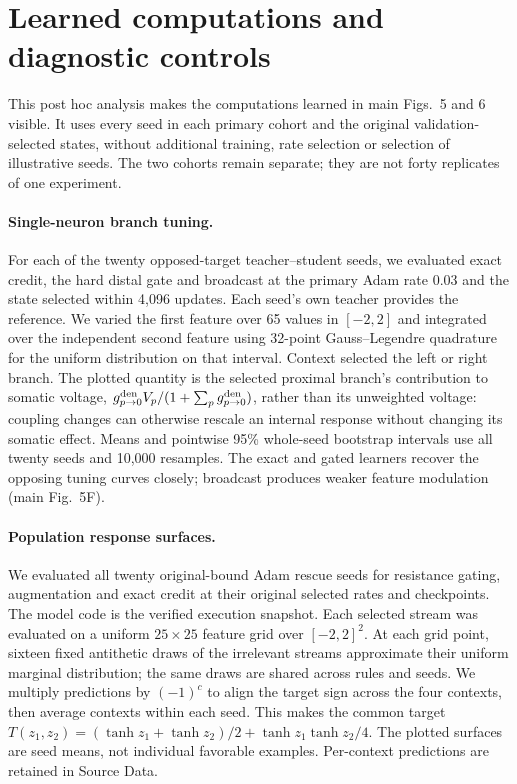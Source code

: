 \section{Learned computations and diagnostic controls}
\label{note:checkpoint_computation}

This post hoc analysis makes the computations learned in main Figs.~5 and 6 visible. It uses every seed in each primary cohort and the original validation-selected states, without additional training, rate selection or selection of illustrative seeds. The two cohorts remain separate; they are not forty replicates of one experiment.

\paragraph{Single-neuron branch tuning.}
For each of the twenty opposed-target teacher--student seeds, we evaluated exact credit, the hard distal gate and broadcast at the primary Adam rate 0.03 and the state selected within 4,096 updates. Each seed's own teacher provides the reference. We varied the first feature over 65 values in $[-2,2]$ and integrated over the independent second feature using 32-point Gauss--Legendre quadrature for the uniform distribution on that interval. Context selected the left or right branch. The plotted quantity is the selected proximal branch's contribution to somatic voltage, $g_{p\to0}^{\rm den}V_p/(1+\sum_p g_{p\to0}^{\rm den})$, rather than its unweighted voltage: coupling changes can otherwise rescale an internal response without changing its somatic effect. Means and pointwise 95\% whole-seed bootstrap intervals use all twenty seeds and 10,000 resamples. The exact and gated learners recover the opposing tuning curves closely; broadcast produces weaker feature modulation (main Fig.~5F).

\paragraph{Population response surfaces.}
We evaluated all twenty original-bound Adam rescue seeds for resistance gating, augmentation and exact credit at their original selected rates and checkpoints. The model code is the verified execution snapshot. Each selected stream was evaluated on a uniform $25\times25$ feature grid over $[-2,2]^2$. At each grid point, sixteen fixed antithetic draws of the irrelevant streams approximate their uniform marginal distribution; the same draws are shared across rules and seeds. We multiply predictions by $(-1)^c$ to align the target sign across the four contexts, then average contexts within each seed. This makes the common target $T(z_1,z_2)=(\tanh z_1+\tanh z_2)/2+\tanh z_1\tanh z_2/4$. The plotted surfaces are seed means, not individual favorable examples. Per-context predictions are retained in Source Data.

